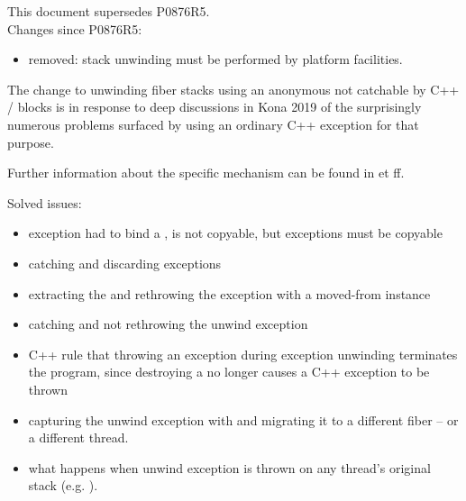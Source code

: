 \label{history}
This document supersedes P0876R5.\\
\newline
Changes since P0876R5:

\begin{itemize}
    \item {} removed: stack unwinding must be
      performed by platform facilities.
\end{itemize}

The change to unwinding fiber stacks using an anonymous \foreignex not
catchable by C++  /  blocks is in response to deep
discussions in Kona 2019 of the surprisingly numerous problems surfaced by
using an ordinary C++ exception for that purpose.

Further information about the specific mechanism can be found in
 et ff.



Solved issues:
\begin{itemize}
    \item exception had to bind a \fiber, \fiber is not copyable, but exceptions must be copyable
    \item catching and discarding exceptions
    \item extracting the \fiber and rethrowing the exception with a moved-from \fiber instance
    \item catching and not rethrowing the unwind exception
    \item C++ rule that throwing an exception during exception unwinding terminates the program, since destroying a \fiber no longer causes a C++ exception to be thrown
    \item capturing the unwind exception with  and migrating it to a different fiber -- or a different thread.
    \item what happens when unwind exception is thrown on any thread's original stack (e.g. \main).
\end{itemize}

